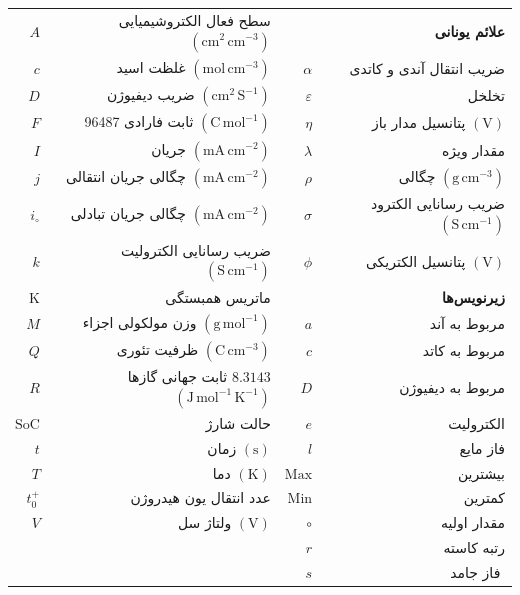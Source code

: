 ‎\vspace{0.5cm}‎
\renewcommand{\arraystretch}{1.5}
‎\begin{table}[!h]‎
‎\begin{tabular}{rrrr}
$A$	&	سطح فعال الکتروشیمیایی	$\mathrm{ (cm^2 \, cm^{-3}) }$	&	\multicolumn{2}{r}{\textbf{\textcolor{BrickRed}{علائم یونانی}}}				\\
$c$	&	غلظت اسید 	$\mathrm{ (mol \, cm^{-3}) }$	&	$\alpha$	&	ضریب انتقال آندی و کاتدی		\\
$D$	&	ضریب دیفیوژن	$\mathrm{ (cm^2 \, S^{-1}) }$	&	$\varepsilon$	&	تخلخل		\\
$F$	&	ثابت فارادی 96487	$\mathrm{ (C \, mol^{-1}) }$	&	$\eta$	&	پتانسیل مدار باز	$\mathrm{ (V) }$	\\
$I$	&	جریان 	$\mathrm{ (mA \, cm^{-2}) }$	&	$\lambda$	&	مقدار ویژه		\\
$j$	&	چگالی جریان انتقالی 	$\mathrm{ (mA \, cm^{-2}) }$	&	$\rho$	&	چگالی	$\mathrm{ (g \, cm^{-3}) }$	\\
$i_\circ$	&	چگالی جریان تبادلی 	$\mathrm{ (mA \, cm^{-2}) }$	&	$\sigma$	&	ضریب رسانایی الکترود	$\mathrm{ (S \, cm^{-1}) }$	\\
$k$	&	ضریب رسانایی الکترولیت	$\mathrm{ (S \, cm^{-1}) }$	&	$\phi$	&	پتانسیل الکتریکی	$\mathrm{ (V) }$	\\
$\mathrm{K}$	&	ماتریس همبستگی		&	\multicolumn{2}{r}{\textbf{\textcolor{BrickRed}{زیرنویس‌ها}}}				\\
$M$	&	وزن مولکولی اجزاء 	$\mathrm{ (g \, mol^{-1}) }$	&	$a$	&	مربوط به آند		\\
$Q$	&	ظرفیت تئوری	$\mathrm{ (C \, cm^{-3}) }$	&	$c$	&	مربوط به کاتد		\\
$R$	&	ثابت جهانی گازها $8.3143$	$\mathrm{ (J \, mol^{-1} \, K^{-1}) }$	&	$D$	&	مربوط به دیفیوژن		\\
$\mathrm{SoC}$	&	حالت شارژ		&	$e$	&	الکترولیت		\\
$t$	&	زمان	$\mathrm{ (s) }$	&	$l$	&	فاز مایع		\\
$T$	&	دما	$\mathrm{ (K) }$	&	$\mathrm{Max}$	&	بیشترین		\\
$t_{0}^{+}$	&	عدد انتقال یون هیدروژن		&	$\mathrm{Min}$	&	کمترین		\\
$V$	&	ولتاژ سل	$\mathrm{ (V) }$	&	$\circ$	&	مقدار اولیه		\\
	&			&	$r$	&	رتبه کاسته		\\
	&			&	$s$	&	فاز جامد		
‎\end{tabular}‎ 
‎\end{table}‎
\renewcommand{\arraystretch}{1.0}


\clearpage















